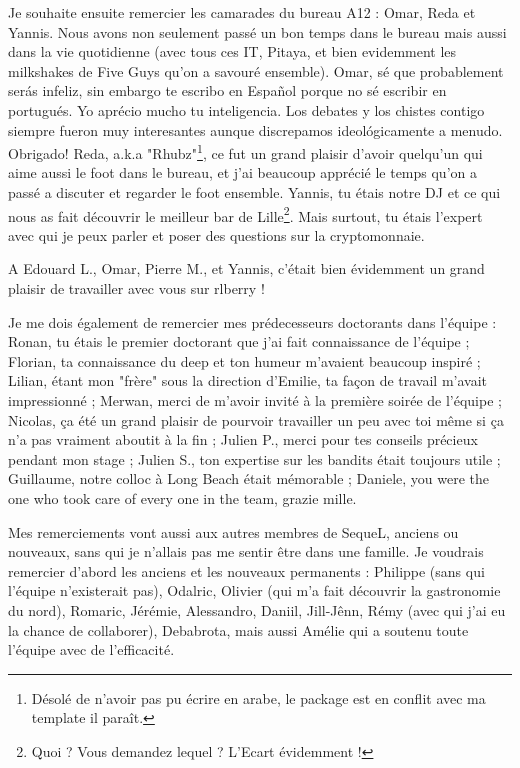 Je souhaite ensuite remercier les camarades du bureau A12 : Omar, Reda et Yannis. Nous avons non seulement pass\'e un bon temps dans le bureau mais aussi dans la vie quotidienne (avec tous ces IT, Pitaya, et bien evidemment les milkshakes de Five Guys qu'on a savour\'e ensemble). Omar, s\'e que probablement ser\'as infeliz, sin embargo te escribo en Español porque no s\'e escribir en portugu\'es. Yo apr\'ecio mucho tu inteligencia. Los debates y los chistes contigo siempre fueron muy interesantes aunque discrepamos ideológicamente a menudo. Obrigado! Reda, a.k.a "Rhubz"\footnote{D\'esol\'e de n'avoir pas pu \'ecrire en arabe, le package est en conflit avec ma template il para\^it.}, ce fut un grand plaisir d'avoir quelqu'un qui aime aussi le foot dans le bureau, et j'ai beaucoup appr\'eci\'e le temps qu'on a pass\'e a discuter et regarder le foot ensemble. Yannis, tu \'etais notre DJ et ce qui nous as fait d\'ecouvrir le meilleur bar de Lille\footnote{Quoi ? Vous demandez lequel ? L'Ecart \'evidemment !}. Mais surtout, tu \'etais l'expert avec qui je peux parler et poser des questions sur la cryptomonnaie.

A Edouard L., Omar, Pierre M., et Yannis, c'\'etait bien \'evidemment un grand plaisir de travailler avec vous sur rlberry !

Je me dois \'egalement de remercier mes pr\'edecesseurs doctorants dans l'\'equipe : Ronan, tu \'etais le premier doctorant que j'ai fait connaissance de l'\'equipe ; Florian, ta connaissance du deep et ton humeur m'avaient beaucoup inspir\'e ; Lilian, \'etant mon "fr\`ere" sous la direction d'Emilie, ta fa\c con de travail m'avait impressionn\'e ; Merwan, merci de m'avoir invit\'e \`a la premi\`ere soir\'ee de l'\'equipe ; Nicolas, \c ca \'et\'e un grand plaisir de pourvoir travailler un peu avec toi m\^eme si \c ca n'a pas vraiment aboutit \`a la fin ; Julien P., merci pour tes conseils pr\'ecieux pendant mon stage ; Julien S., ton expertise sur les bandits \'etait toujours utile ; Guillaume, notre colloc \`a Long Beach \'etait m\'emorable ; Daniele, you were the one who took care of every one in the team, grazie mille.

Mes remerciements vont aussi aux autres membres de SequeL, anciens ou nouveaux, sans qui je n'allais pas me sentir \^etre dans une famille. Je voudrais remercier d'abord les anciens et les nouveaux permanents : Philippe (sans qui l'\'equipe n'existerait pas), Odalric, Olivier (qui m'a fait d\'ecouvrir la gastronomie du nord), Romaric, J\'er\'emie, Alessandro, Daniil, Jill-J\^enn, R\'emy (avec qui j'ai eu la chance de collaborer), Debabrota, mais aussi Am\'elie qui a soutenu toute l'\'equipe avec de l'efficacit\'e.

